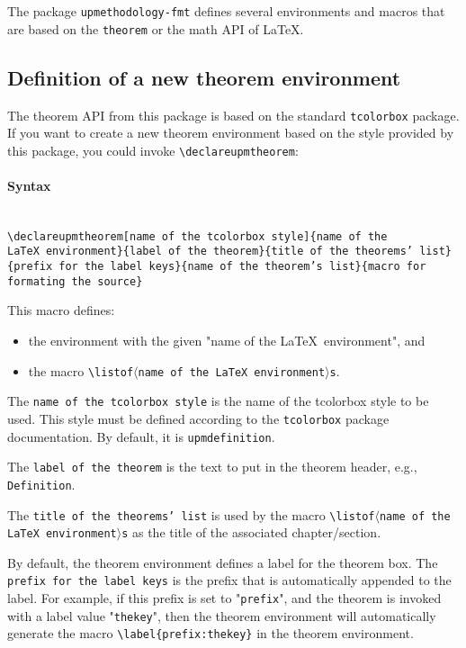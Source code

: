 \documentclass[book,taskpackage,specpackage,codepackage]{upmethodology-document}
\begin{document}
The package \texttt{upmethodology-fmt} defines several environments and macros that are based on the \texttt{theorem} or the math API of \LaTeX.

\subsection{Definition of a new theorem environment}

The theorem API from this package is based on the standard \texttt{tcolorbox} package.
If you want to create a new theorem environment based on the style provided by this package, you could invoke \texttt{{\textbackslash}declareupmtheorem}:

\paragraph{Syntax} \mbox{}\\
\texttt{{\textbackslash}declareupmtheorem[name of the tcolorbox style]\{name of the \LaTeX\ environment\}\{label of the theorem\}\{title of the theorems' list\}\{prefix for the label keys\}\{name of the theorem's list\}\{macro for formating the source\}}

This macro defines:
\begin{itemize}
\item the environment with the given "name of the \LaTeX\ environment", and
\item the macro \texttt{{\textbackslash}listof$\langle$name of the \LaTeX\ environment$\rangle$s}.
\end{itemize}

The \texttt{name of the tcolorbox style} is the name of the tcolorbox style to be used. This style must be defined according to the \texttt{tcolorbox} package documentation. By default, it is \texttt{upmdefinition}.

The \texttt{label of the theorem} is the text to put in the theorem header, e.g., \texttt{Definition}.

The \texttt{title of the theorems' list} is used by the macro \texttt{{\textbackslash}listof$\langle$name of the \LaTeX\ environment$\rangle$s} as the title of the associated chapter/section.

By default, the theorem environment defines a label for the theorem box. The \texttt{prefix for the label keys} is the prefix that is automatically appended to the label. For example, if this prefix is set to "\texttt{prefix}", and the theorem is invoked with a label value "\texttt{thekey}", then the theorem environment will automatically generate the macro \texttt{{\textbackslash}label\{prefix:thekey\}} in the theorem environment.
\end{document}
